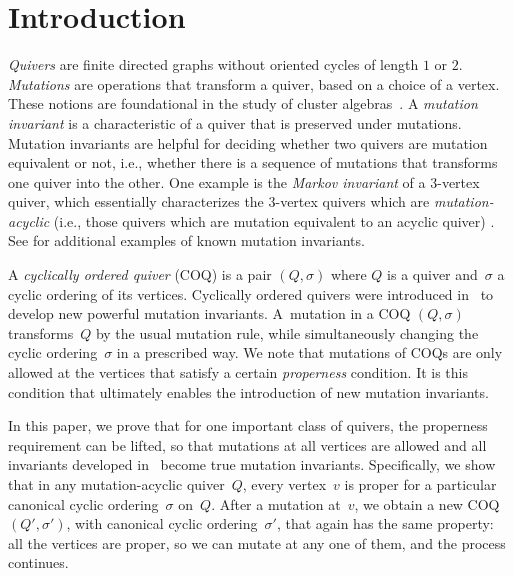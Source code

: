 \documentclass[11pt, letterpaper]{amsart}
\theoremstyle{definition}
\numberwithin{equation}{section}
\begin{document}

\thispagestyle{empty}

\section{Introduction}
\emph{Quivers} are finite directed graphs without oriented cycles of length $1$ or $2$. 
\emph{Mutations} are operations that transform a quiver, based on a choice of a vertex.
These notions are foundational in the study of cluster algebras~\cite{CA1}.
A \emph{mutation invariant} is a characteristic of a quiver that is preserved under mutations.
Mutation invariants are helpful for deciding whether two quivers are mutation equivalent or not,
i.e., whether there is a sequence of mutations that transforms one quiver into the other.
One example is the \emph{Markov invariant} of a $3$-vertex quiver, which essentially characterizes the $3$-vertex quivers which are \emph{mutation-acyclic} (i.e., those quivers which are  mutation equivalent to an acyclic quiver) \cite{BBH}.
See \cite{casals-binary, ervinPrefork, CAtextbook1-3, Seven3x3, Seven-congruence} for additional examples of known mutation invariants. 

A \emph{cyclically ordered quiver} (COQ) is a pair $(Q, \sigma)$ where $Q$ is a quiver and~$\sigma$ a cyclic ordering of its vertices.
Cyclically ordered quivers were introduced in~\cite{COQ} to develop new powerful mutation invariants. 
A~mutation in a COQ $(Q, \sigma)$ transforms~$Q$ by the usual mutation rule,
while simultaneously changing the cyclic ordering~$\sigma$ in a prescribed way.
We note that mutations of COQs are only allowed at the vertices that satisfy a certain \emph{properness} condition. 
It is this condition that ultimately enables the introduction of new mutation invariants. 


In this paper, we prove that for one important class of quivers, the properness requirement can be lifted, 
so that mutations at all vertices are allowed and all invariants developed in~\cite{COQ} become true mutation invariants.
Specifically, we show that in any mutation-acyclic quiver~$Q$, %
every vertex~$v$ is proper for a particular canonical cyclic ordering~$\sigma$ on~$Q$. 
After a mutation at~$v$, we obtain a new COQ $(Q',\sigma')$, with canonical cyclic ordering~$\sigma'$,
that again has the same property: all the vertices are proper, so we can mutate at any one of them, 
and the process continues. 
\end{document}
